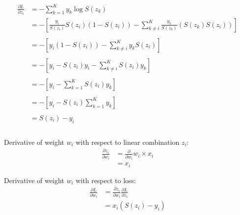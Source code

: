 \begin{align*}
    \frac{\partial L}{\partial z_i} &= - \sum^{K}_{k=1} y_k \log S(z_k) \\
    &= - \left[ \frac{y_i}{S(z_i)}S(z_i)(1 - S(z_i)) - \sum^{K}_{k\neq i} \frac{y_k}{S(z_k)}(S(z_k)S(z_i))  \right]\\\\
    &= - \left[ y_i(1 - S(z_i)) - \sum^{K}_{k\neq i} y_k S(z_i) \right]\\\\
    &= - \left[ y_i - S(z_i) y_i  - \sum^{K}_{k\neq i} S(z_i) y_k  \right]\\\\
    &= - \left[ y_i - \sum^{K}_{k=1}  S(z_i) y_k \right]\\\\
    &= - \left[ y_i - S(z_i) \sum^{K}_{k=1}  y_k \right]\\\\
    &= S(z_i) - y_i\\\\
\end{align*}

Derivative of weight $w_i$ with respect to linear combination $z_i$:\\

\begin{align*}
    \frac{\partial z_i}{\partial w_i} &= \frac{\partial}{\partial w_i} w_i \times x_i\\
    &= x_i
\end{align*}

Derivative of weight $w_i$ with respect to loss:\\

\begin{align*}
    \frac{\partial L}{\partial w_i} &= \frac{\partial z_i}{\partial w_i}\frac{\partial L}{\partial z_i}\\
    &= x_i (S(z_i) - y_i)\\
\end{align*}
